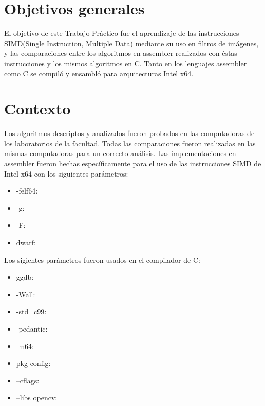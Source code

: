 \documentclass[a4paper]{article}
\begin{document}
\thispagestyle{empty}

\maketitle
\newpage

\thispagestyle{empty}
\vfill
\begin{abstract}
En el presente trabajo se describe el an\'alisis de siertos filtros para im\'agenes, comparando las versiones realizadas en C y en assembler con procesamiento SIMD
\end{abstract}
\newpage
\thispagestyle{empty}
\vspace{3cm}
\tableofcontents
\newpage


\normalsize
\newpage

\section{Objetivos generales}

El objetivo de este Trabajo Pr\'actico fue el aprendizaje de las instrucciones SIMD(Single Instruction, Multiple Data) mediante su uso en filtros de im\'agenes, y las comparaciones entre los algoritmos en assembler realizados con \'estas instrucciones y los mismos algoritmos en C.
Tanto en los lenguajes assembler como C se compil\'o y ensambl\'o para arquitecturas Intel x64.

\section{Contexto}

Los algoritmos descriptos y analizados fueron probados en las computadoras de los laboratorios de la facultad. Todas las comparaciones fueron realizadas en las mismas computadoras para un correcto an\'alisis.
Las implementaciones en assembler fueron hechas específicamente para el uso de las instrucciones SIMD de Intel x64 con los siguientes par\'ametros:
\begin{itemize}
	\item -felf64:
	\item -g:
	\item -F:
	\item dwarf:
\end{itemize}
Los sigientes par\'ametros fueron usados en el compilador de C:
\begin{itemize}
	\item ggdb:
	\item -Wall:
	\item -std=c99:
	\item -pedantic:
	\item -m64:
	
	\item pkg-config:
	\item --cflags:
	\item --libs opencv:
\end{itemize}
\end{document}
